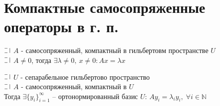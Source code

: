 \section*{Компактные самосопряженные операторы в г. п.}
\begin{theorem}
  $\letus$ $A$ - самосопряженный, компактный в гильбертовм пространстве $U$\\
  $\letus$ $A \not = 0$, тогда $\exists \lambda \not = 0, \ x \not = 0: Ax = \lambda x$
\end{theorem}

\begin{theorem}
  $\letus$ $U$ - сепарабельное гильбертово пространство\\
  $\letus$ $A$ - самосопряженный, компактный в $U$\\
  Тогда $\exists \{y_i\}_{i=1}^{\infty}$ -- ортонормированный базис $U$: $Ay_i = \lambda_i y_i, \; \forall i \in \mathbb{N}$
\end{theorem}